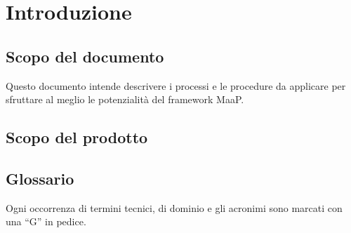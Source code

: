 \section{Introduzione}

	\subsection{Scopo del documento}
	Questo documento intende descrivere i processi e le procedure da applicare per sfruttare al meglio le potenzialità del framework MaaP.

	\subsection{Scopo del prodotto}
	\ScopoDelProdotto	
	
	\subsection{Glossario}
	Ogni occorrenza di termini tecnici, di dominio e gli acronimi sono marcati con una ``G'' in pedice.